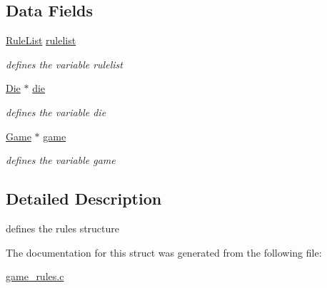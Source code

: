 \subsection*{Data Fields}
\begin{DoxyCompactItemize}
\item 
\mbox{\label{struct__Rules_a9febb4df1e8e36c8340c9d6b206d2d3c}} 
\hyperlink{game__rules_8h_a7a04f8c7bfd4a66dd1aa598a1f6f9c6c}{Rule\+List} \hyperlink{struct__Rules_a9febb4df1e8e36c8340c9d6b206d2d3c}{rulelist}
\begin{DoxyCompactList}\small\item\em defines the variable rulelist \end{DoxyCompactList}\item 
\mbox{\label{struct__Rules_abdbc2fc4222a97be384ddcc61425b6ec}} 
\hyperlink{die_8h_a892f0b0bf81d69a1f7a14ea238e36dd3}{Die} $\ast$ \hyperlink{struct__Rules_abdbc2fc4222a97be384ddcc61425b6ec}{die}
\begin{DoxyCompactList}\small\item\em defines the variable die \end{DoxyCompactList}\item 
\mbox{\label{struct__Rules_a416c4fd5f34414b4cc3932d3bde207be}} 
\hyperlink{game_8h_a57156d39c530aec3fba3a9dad8c2dc6a}{Game} $\ast$ \hyperlink{struct__Rules_a416c4fd5f34414b4cc3932d3bde207be}{game}
\begin{DoxyCompactList}\small\item\em defines the variable game \end{DoxyCompactList}\end{DoxyCompactItemize}


\subsection{Detailed Description}
defines the rules structure 

The documentation for this struct was generated from the following file\+:\begin{DoxyCompactItemize}
\item 
\hyperlink{game__rules_8c}{game\+\_\+rules.\+c}\end{DoxyCompactItemize}

